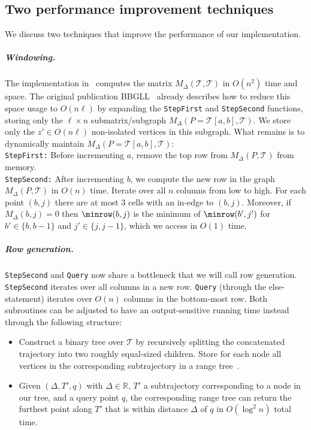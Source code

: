 \subsection{Two performance improvement techniques}
\label{sub:improvement}
%
We discuss two techniques that improve the performance of our implementation. 
%
\subparagraph{Windowing. }
The implementation in~\cite{movetk} computes the matrix $M_\Delta(\mathcal{T}, \mathcal{T})$ in $O(n^2)$ time and space. 
The original publication BBGLL~\cite{buchin2011detecting} already describes how to reduce this space usage to $O(n \ell)$ by expanding the \texttt{StepFirst} and \texttt{StepSecond} functions, storing only the $\ell \times n$ submatrix/subgraph $M_\Delta(P = \mathcal{T}[a, b], \mathcal{T})$. 
We store only the $z' \in O(n \ell)$ non-isolated vertices in this subgraph. What remains is to dynamically maintain  $M_\Delta(P = \mathcal{T}[a, b], \mathcal{T})$: \\
%
\texttt{StepFirst:}
Before incrementing $a$, remove the top row from $M_\Delta(P, \mathcal{T})$ from memory. \\ 
%
\texttt{StepSecond:}
After incrementing $b$, we compute the new row in the graph $M_\Delta(P, \mathcal{T})$ in $O(n)$ time. 
Iterate over all $n$ columns from low to high.  For each point $(b, j)$ there are at most $3$ cells with an in-edge to $(b, j)$. Moreover, if $M_\Delta(b, j) = 0$ then $\minrow(b, j)$ is the minimum of  $\minrow(b', j')$ for $b' \in \{b, b-1 \}$ and $j' \in \{j, j-1 \}$, which we access in $O(1)$ time. 
%
%
%
%
    \subparagraph{Row generation.}
    \texttt{StepSecond} and \texttt{Query} now share a bottleneck that we will call row generation. 
    \texttt{StepSecond} iterates over all columns in a new row. 
    \texttt{Query} (through the else-statement) iterates over $O(n)$ columns in the bottom-most row. Both subroutines can be adjusted to have an output-sensitive running time instead through the following structure:
%
\begin{itemize}
    \item    Construct a binary tree over $\mathcal{T}$ by recursively {splitting} the concatenated trajectory into two roughly equal-sized children. 
    Store for each node all vertices in the corresponding subtrajectory in a range tree~\cite{DBLP:books/lib/BergCKO08}. 
    \item     Given $(\Delta, T', q)$ with $\Delta \in \mathbb{R}$, $T'$ a subtrajectory corresponding to a node in our tree, and a query point $q$, the corresponding range tree can return the furthest point along $T'$ that is within distance $\Delta$ of $q$ in $O(\log^2 n)$ total time. 
\end{itemize}
